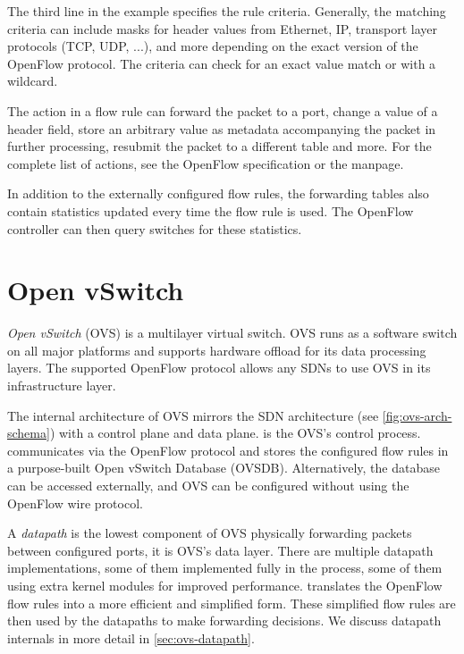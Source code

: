 The third line in the example specifies the rule criteria. Generally, the matching criteria can include masks for header values from Ethernet, IP, transport layer protocols (TCP, UDP, ...), and more depending on the exact version of the OpenFlow protocol. The criteria can check for an exact value match or with a wildcard.

The action in a flow rule can forward the packet to a port, change a value of a header field, store an arbitrary value as metadata accompanying the packet in further processing, resubmit the packet to a different table and more. For the complete list of actions, see the OpenFlow specification  or the  manpage.

In addition to the externally configured flow rules, the forwarding tables also contain statistics updated every time the flow rule is used. The OpenFlow controller can then query switches for these statistics.

\section{Open vSwitch}
\label{sec:ovs}

\emph{Open vSwitch} (OVS) \cite{OVSWeb} is a multilayer virtual switch. OVS runs as a software switch on all major platforms and supports hardware offload for its data processing layers. The supported OpenFlow protocol allows any SDNs to use OVS in its infrastructure layer.

The internal architecture of OVS mirrors the SDN architecture (see \cref{fig:ovs-arch-schema}) with a control plane and data plane.  is the OVS's control process.  communicates via the OpenFlow protocol and stores the configured flow rules in a purpose-built Open vSwitch Database (OVSDB). Alternatively, the database can be accessed externally, and OVS can be configured without using the OpenFlow wire protocol.

A \emph{datapath} is the lowest component of OVS physically forwarding packets between configured ports, it is OVS's data layer. There are multiple datapath implementations, some of them implemented fully in the  process, some of them using extra kernel modules for improved performance.  translates the OpenFlow flow rules into a more efficient and simplified form. These simplified flow rules are then used by the datapaths to make forwarding decisions. We discuss datapath internals in more detail in \cref{sec:ovs-datapath}.


